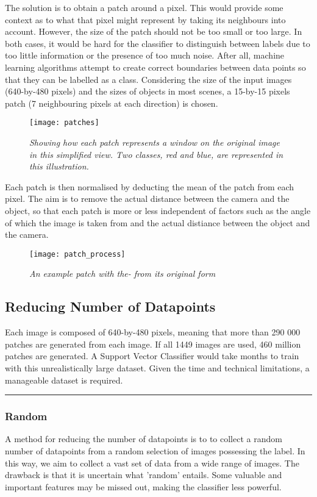 \documentclass[dissertation.tex]{subfiles}
\begin{document}
The solution is to obtain a patch around a pixel. This would provide some context as to what that pixel might represent by taking its neighbours into account. However, the size of the patch should not be too small or too large. In both cases, it would be hard for the classifier to distinguish between labels due to too little information or the presence of too much noise. After all, machine learning algorithms attempt to create correct boundaries between data points so that they can be labelled as a class. Considering the size of the input images (640-by-480 pixels) and the sizes of objects in most scenes, a 15-by-15 pixels patch (7 neighbouring pixels at each direction) is chosen.

\begin{figure}[h]
  \centering
  \texttt{[image: patches]}
  \caption{\textit{Showing how each patch represents a window on the original image in this simplified view. Two classes, red and blue, are represented in this illustration.}}
  \label{fig:patches}
\end{figure}

Each patch is then normalised by deducting the mean of the patch from each pixel. The aim is to remove the actual distance between the camera and the object, so that each patch is more or less independent of factors such as the angle of which the image is taken from and the actual distiance between the object and the camera. 

\begin{figure}[h]
  \centering
  \texttt{[image: patch\_process]}
  \caption{\textit{An example patch with the- from its original form }}
  \label{fig:patch_process}
\end{figure}

\subsection{Reducing Number of Datapoints}
Each image is composed of 640-by-480 pixels, meaning that more than 290 000 patches are generated from each image. If all 1449 images are used, 460 million patches are generated. A Support Vector Classifier would take months to train with this unrealistically large dataset. Given the time and technical limitations, a manageable dataset is required. 

\rule{200pt}{1pt}
\subsubsection{Random}
A method for reducing the number of datapoints is to to collect a random number of datapoints from a random selection of images possessing the label. In this way, we aim to collect a vast set of data from a wide range of images. The drawback is that it is uncertain what 'random' entails. Some valuable and important features may be missed out, making the classifier less powerful.
\end{document}
